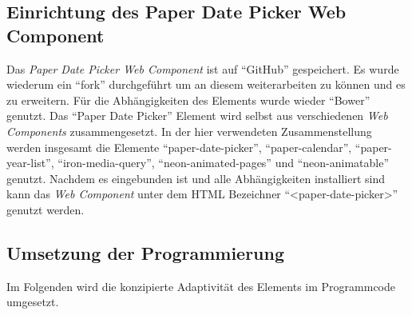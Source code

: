 \documentclass[12pt, paper=a4, bibtotoc, toc=listof, headsepline=true, numbers=endperiod]{scrreprt}
\begin{document}
		\subsection{Einrichtung des Paper Date Picker Web Component}
		Das \emph{Paper Date Picker Web Component} ist auf \enquote{GitHub} gespeichert. Es wurde wiederum ein \enquote{fork} durchgeführt um an diesem weiterarbeiten zu können und es zu erweitern. Für die Abhängigkeiten des Elements wurde wieder \enquote{Bower} genutzt. Das \enquote{Paper Date Picker} Element wird selbst aus verschiedenen \emph{Web Components} zusammengesetzt. In der hier verwendeten Zusammenstellung werden insgesamt die Elemente \enquote{paper-date-picker}, \enquote{paper-calendar}, \enquote{paper-year-list}, \enquote{iron-media-query}, \enquote{neon-animated-pages} und \enquote{neon-animatable} genutzt. Nachdem es eingebunden ist und alle Abhängigkeiten installiert sind kann das \emph{Web Component} unter dem \ac{HTML} Bezeichner \enquote{<paper-date-picker>} genutzt werden.
		\subsection{Umsetzung der Programmierung}
		Im Folgenden wird die konzipierte Adaptivität des Elements im Programmcode umgesetzt. 
\end{document}

